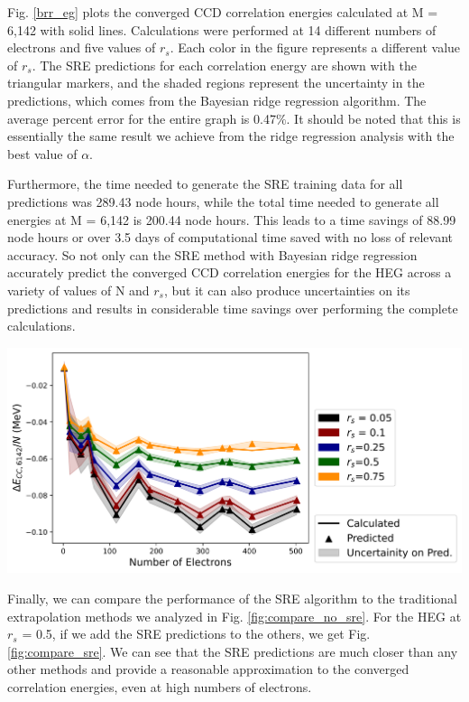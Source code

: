 Fig. \ref{brr_eg} plots the converged CCD correlation energies calculated at M = 6,142 with solid lines. Calculations were performed at 14 different numbers of electrons and five values of $r_s$. Each color in the figure represents a different value of $r_s$. The SRE predictions for each correlation energy are shown with the triangular markers, and the shaded regions represent the uncertainty in the predictions, which comes from the Bayesian ridge regression algorithm. The average percent error for the entire graph is 0.47$\%$.  It should be noted that this is essentially the same result we achieve from the ridge regression analysis with the best value of $\alpha$.

Furthermore, the time needed to generate the SRE training data for all predictions was 289.43 node hours, while the total time needed to generate all energies at M = 6,142 is 200.44 node hours. This leads to a time savings of 88.99 node hours or over 3.5 days of computational time saved with no loss of relevant accuracy. So not only can the SRE method with Bayesian ridge regression accurately predict the converged CCD correlation energies for the HEG across a variety of values of N and $r_s$, but it can also produce uncertainties on its predictions and results in considerable time savings over performing the complete calculations.


\begin{center}
    \includegraphics[scale=0.75]{Images/Chapter7/ElectronGas/BRR_EG_MSU_uncertainities.png}
    \label{brr_eg}
\end{center}


Finally, we can compare the performance of the SRE algorithm to the traditional extrapolation methods we analyzed in Fig. \ref{fig:compare_no_sre}.  For the HEG at $r_s$ = 0.5, if we add the SRE predictions to the others, we get Fig. \ref{fig:compare_sre}.  We can see that the SRE predictions are much closer than any other methods and provide a reasonable approximation to the converged correlation energies, even at high numbers of electrons.

